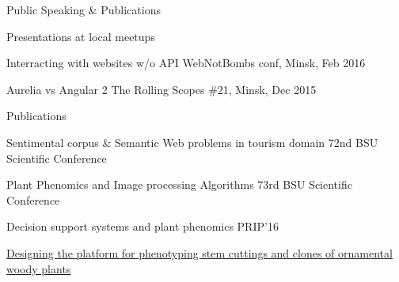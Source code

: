 \documentclass{resume} %
\begin{document}
\begin{rSection}{Public Speaking & Publications}

    \begin{rSubsection}{Presentations at local meetups}{}{}

    \item Interracting with websites w/o API \hfill WebNotBombs conf, Minsk, Feb 2016
    \item Aurelia vs Angular 2 \hfill The Rolling Scopes \#21, Minsk, Dec 2015

    \end{rSubsection}

    \begin{rSubsection}{Publications}{}{}

    \item Sentimental corpus \& Semantic Web problems in tourism domain \hfill 72nd BSU Scientific Conference
    \item Plant Phenomics and Image processing Algorithms \hfill 73rd BSU Scientific Conference
    \item Decision support systems and plant phenomics \hfill PRIP'16
    \item \href{http://textlab.io/doc/8452214}{Designing the platform for phenotyping stem cuttings and clones of ornamental woody plants}
    \end{rSubsection}
\end{rSection}






\end{document}
